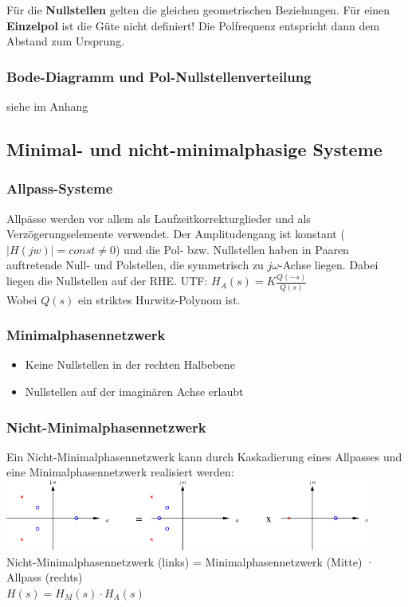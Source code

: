   Für die \textbf{Nullstellen} gelten die gleichen geometrischen Beziehungen.
  Für einen \textbf{Einzelpol} ist die Güte nicht definiert! Die Polfrequenz entspricht dann dem Abstand zum Ursprung.
  
  \subsubsection{Bode-Diagramm und Pol-Nullstellenverteilung}
  siehe im Anhang

\subsection{Minimal- und nicht-minimalphasige Systeme }
\subsubsection{Allpass-Systeme}
Allpässe werden vor allem als Laufzeitkorrekturglieder und als
Verzögerungselemente verwendet. Der Amplitudengang ist konstant ($|H(jw)| =
const \neq 0$) und die Pol- bzw. Nullstellen haben in Paaren auftretende Null-
und Polstellen, die symmetrisch zu $j \omega$-Achse liegen. Dabei liegen die
Nullstellen auf der RHE.
UTF: $H_A(s) = K \frac{Q(-s)}{Q(s)}$ \\
Wobei $Q(s)$ ein striktes Hurwitz-Polynom ist.



\subsubsection{Minimalphasennetzwerk }
\begin{itemize}
  \item Keine Nullstellen in der rechten Halbebene
  \item Nullstellen auf der imaginären Achse erlaubt
\end{itemize}


\subsubsection{Nicht-Minimalphasennetzwerk}
Ein Nicht-Minimalphasennetzwerk kann durch Kaskadierung eines Allpasses und
eine Minimalphasennetzwerk realisiert werden:\\
\includegraphics[width=12cm]{./images/nicht-minimalphasennetzwerk.png}\\
Nicht-Minimalphasennetzwerk (links) = Minimalphasennetzwerk (Mitte) · Allpass (rechts) \\
$H(s) = H_M(s) \cdot H_A(s)$

